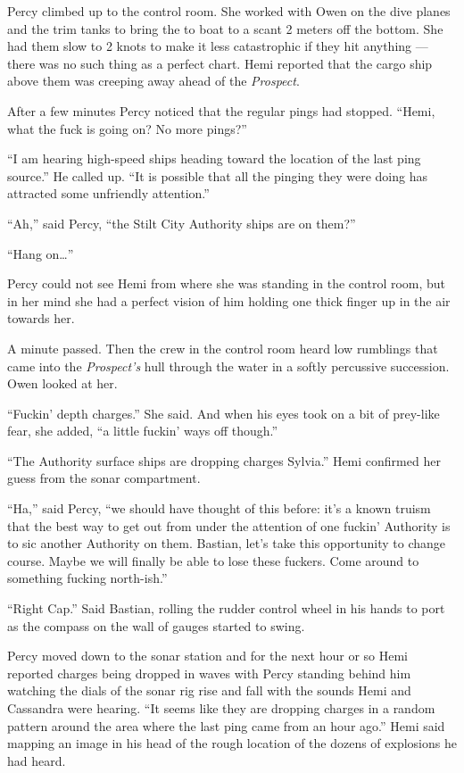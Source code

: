 \documentclass[]{scrbook}
\begin{document}
Percy climbed up to the control room. She worked with Owen on the dive
planes and the trim tanks to bring the to boat to a scant 2 meters off
the bottom. She had them slow to 2 knots to make it less catastrophic if
they hit anything --- there was no such thing as a perfect chart. Hemi
reported that the cargo ship above them was creeping away ahead of the
\emph{Prospect}.

After a few minutes Percy noticed that the regular pings had stopped.
``Hemi, what the fuck is going on? No more pings?''

``I am hearing high-speed ships heading toward the location of the last
ping source.'' He called up. ``It is possible that all the pinging they
were doing has attracted some unfriendly attention.''

``Ah,'' said Percy, ``the Stilt City Authority ships are on them?''

``Hang on\ldots{}''

Percy could not see Hemi from where she was standing in the control
room, but in her mind she had a perfect vision of him holding one thick
finger up in the air towards her.

A minute passed. Then the crew in the control room heard low rumblings
that came into the \emph{Prospect's} hull through the water in a softly
percussive succession. Owen looked at her.

``Fuckin' depth charges.'' She said. And when his eyes took on a bit of
prey-like fear, she added, ``a little fuckin' ways off though.''

``The Authority surface ships are dropping charges Sylvia.'' Hemi
confirmed her guess from the sonar compartment.

``Ha,'' said Percy, ``we should have thought of this before: it's a
known truism that the best way to get out from under the attention of
one fuckin' Authority is to sic another Authority on them. Bastian,
let's take this opportunity to change course. Maybe we will finally be
able to lose these fuckers. Come around to something fucking
north-ish.''

``Right Cap.'' Said Bastian, rolling the rudder control wheel in his
hands to port as the compass on the wall of gauges started to swing.

Percy moved down to the sonar station and for the next hour or so Hemi
reported charges being dropped in waves with Percy standing behind him
watching the dials of the sonar rig rise and fall with the sounds Hemi
and Cassandra were hearing. ``It seems like they are dropping charges in
a random pattern around the area where the last ping came from an hour
ago.'' Hemi said mapping an image in his head of the rough location of
the dozens of explosions he had heard.
\end{document}
